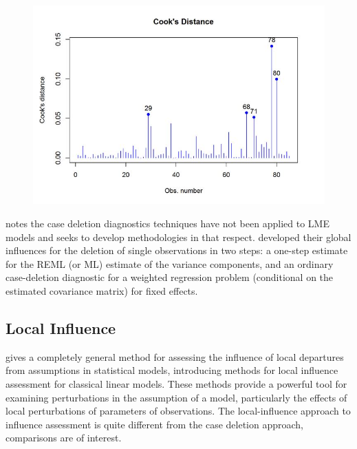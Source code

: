 \documentclass[12pt, a4paper]{report}
\theoremstyle{definition}
\theoremstyle{remark}
\begin{document}
\begin{figure}[h!]
	\centering
	\includegraphics[width=0.9\linewidth]{images/CooksDistancePlot-JS-Roy}
	\caption{}
	\label{fig:CooksDistancePlot-JS-Roy}
\end{figure}
%
\citet{Christensen} notes the case deletion diagnostics techniques have not been applied to LME models and seeks to develop methodologies in that respect. \citet{Christensen} developed their global influences for the deletion of single observations in two steps: a one-step estimate for the REML (or ML) estimate of the variance components, and an ordinary case-deletion diagnostic for a weighted regression problem (conditional on the estimated covariance matrix) for fixed effects.








\subsection{Local Influence}
\citet{cook86} gives a completely general method for assessing the influence of local departures from assumptions in statistical models, introducing methods for local influence assessment for classical linear models. These methods provide a powerful tool for examining perturbations in the assumption of a model, particularly the effects of local perturbations of parameters of observations. The local-influence approach to influence assessment is quite different from the case deletion approach, comparisons are of interest.
\end{document}
